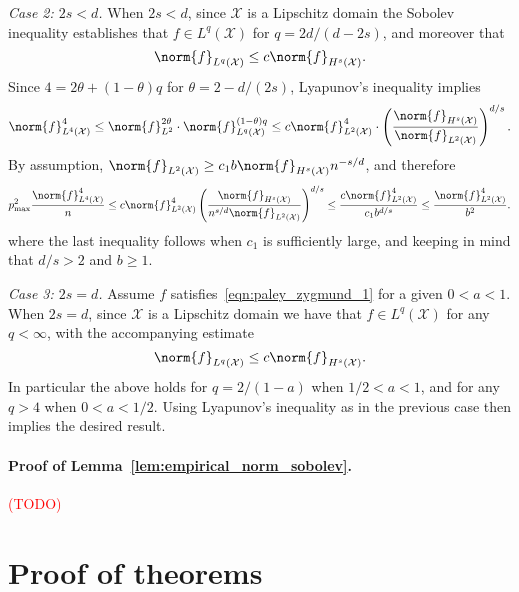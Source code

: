 \documentclass[twoside]{article}
\newcommand{\1}{\mathbf{1}}
\newcommand{\Xset}{\mathcal{X}}
\newcommand{\Leb}{L}
\theoremstyle{definition}
\theoremstyle{remark}
\begin{document}
\textit{Case 2: $2s < d$.}
When $2s < d$, since $\Xset$ is a Lipschitz domain the Sobolev inequality establishes that $f \in \Leb^q(\Xset)$ for $q = 2d/(d - 2s)$, and moreover that
\begin{equation*}
\norm{f}_{\Leb^q(\Xset)} \leq c \norm{f}_{H^s(\Xset)}.
\end{equation*}
Since $4 = 2\theta + (1 - \theta)q$ for $\theta = 2 - d/(2s)$, Lyapunov's inequality implies
\begin{equation*}
\norm{f}_{\Leb^4(\Xset)}^4 \leq \norm{f}_{\Leb^2}^{2\theta} \cdot \norm{f}_{\Leb^q(\Xset)}^{(1 - \theta)q} \leq c \norm{f}_{\Leb^2(\Xset)}^{4} \cdot \left(\frac{\norm{f}_{H^s(\Xset)}}{\norm{f}_{\Leb^2(\Xset)}}\right)^{d/s}.
\end{equation*}
By assumption, $\norm{f}_{\Leb^2(\Xset)} \geq c_1 b \norm{f}_{H^s(\Xset)} n^{-s/d}$, and therefore
\begin{equation*}
p_{\max}^2 \frac{\norm{f}_{\Leb^4(\Xset)}^4}{n} \leq c\norm{f}_{\Leb^2(\Xset)}^4 \left(\frac{\norm{f}_{H^s(\Xset)}}{n^{s/d}\norm{f}_{\Leb^2(\Xset)}}\right)^{d/s} \leq \frac{c\norm{f}_{\Leb^2(\Xset)}^4}{c_1b^{d/s}} \leq \frac{\norm{f}_{\Leb^2(\Xset)}^4}{b^2}.
\end{equation*}
where the last inequality follows when $c_1$ is sufficiently large, and keeping in mind that $d/s > 2$ and $b \geq 1$. 

\textit{Case 3: $2s = d$.}
Assume $f$ satisfies~\eqref{eqn:paley_zygmund_1} for a given $0 < a < 1$. When $2s = d$, since $\Xset$ is a Lipschitz domain we have that $f \in L^q(\Xset)$ for any $q < \infty$, with the accompanying estimate
\begin{equation*}
\norm{f}_{\Leb^q(\Xset)} \leq c \norm{f}_{H^s(\Xset)}.
\end{equation*}
In particular the above holds for $q = 2/(1 - a)$ when $1/2 < a < 1$, and for any $q > 4$ when $0 < a < 1/2$. Using Lyapunov's inequality as in the previous case then implies the desired result.

\paragraph{Proof of Lemma~\ref{lem:empirical_norm_sobolev}.}

\textcolor{red}{(TODO)}

\section{Proof of theorems}
\end{document}
